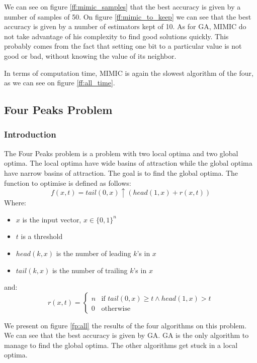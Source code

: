 \documentclass[twocolumn, 10pt]{article}
\begin{document}
				We can see on figure \ref{ff:mimic_samples} that the best accuracy is given by a number of samples of 50. On figure \ref{ff:mimic_to_keep} we can see that the best accuracy is given by a number of estimators kept of 10. As for GA, MIMIC do not take advantage of his complexity to find good solutions quickly. This probably comes from the fact that setting one bit to a particular value is not good or bad, without knowing the value of its neighbor.

				In terms of computation time, MIMIC is again the slowest algorithm of the four, as we can see on figure \ref{ff:all_time}.
		\subsection{Four Peaks Problem}
			\subsubsection*{Introduction}
				The Four Peaks problem is a problem with two local optima and two global optima. The local optima have wide basins of attraction while the global optima have narrow basins of attraction. The goal is to find the global optima. The function to optimise is defined as follows:
				\begin{equation}
					f(x, t) = tail(0, x) \uparrow (head(1, x) + r(x, t))
				\end{equation}
				Where:
				\begin{itemize}
					\item $x$ is the input vector, $x \in \{0, 1\}^n$
					\item $t$ is a threshold
					\item $head(k, x)$ is the number of leading $k$'s in $x$
					\item $tail(k, x)$ is the number of trailing $k$'s in $x$
				\end{itemize}
				and:
				\begin{equation}
					r(x, t) = \begin{cases}
						n & \text{if } tail(0, x) \geq t \land head(1, x) > t \\
						0 & \text{otherwise}
					\end{cases}
				\end{equation}

				We present on figure \ref{fp:all} the results of the four algorithms on this problem. We can see that the best accuracy is given by GA. GA is the only algorithm to manage to find the global optima. The other algorithms get stuck in a local optima.
\end{document}
